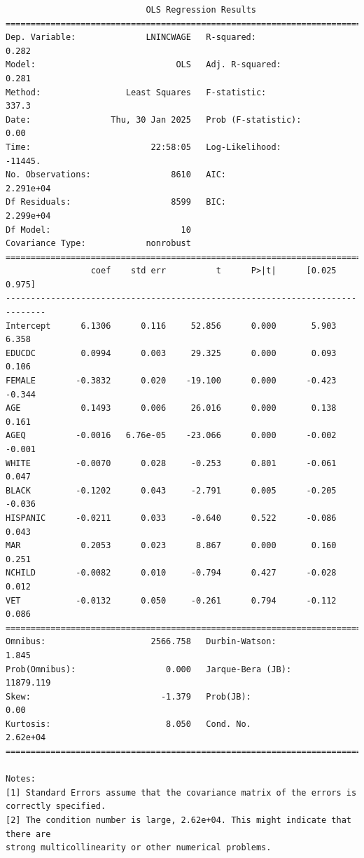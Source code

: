 \documentclass[
  11pt,
  letterpaper,
  DIV=11,
  numbers=noendperiod]{scrartcl}
\begin{document}
\begin{verbatim}
                            OLS Regression Results                            
==============================================================================
Dep. Variable:              LNINCWAGE   R-squared:                       0.282
Model:                            OLS   Adj. R-squared:                  0.281
Method:                 Least Squares   F-statistic:                     337.3
Date:                Thu, 30 Jan 2025   Prob (F-statistic):               0.00
Time:                        22:58:05   Log-Likelihood:                -11445.
No. Observations:                8610   AIC:                         2.291e+04
Df Residuals:                    8599   BIC:                         2.299e+04
Df Model:                          10                                         
Covariance Type:            nonrobust                                         
==============================================================================
                 coef    std err          t      P>|t|      [0.025      0.975]
------------------------------------------------------------------------------
Intercept      6.1306      0.116     52.856      0.000       5.903       6.358
EDUCDC         0.0994      0.003     29.325      0.000       0.093       0.106
FEMALE        -0.3832      0.020    -19.100      0.000      -0.423      -0.344
AGE            0.1493      0.006     26.016      0.000       0.138       0.161
AGEQ          -0.0016   6.76e-05    -23.066      0.000      -0.002      -0.001
WHITE         -0.0070      0.028     -0.253      0.801      -0.061       0.047
BLACK         -0.1202      0.043     -2.791      0.005      -0.205      -0.036
HISPANIC      -0.0211      0.033     -0.640      0.522      -0.086       0.043
MAR            0.2053      0.023      8.867      0.000       0.160       0.251
NCHILD        -0.0082      0.010     -0.794      0.427      -0.028       0.012
VET           -0.0132      0.050     -0.261      0.794      -0.112       0.086
==============================================================================
Omnibus:                     2566.758   Durbin-Watson:                   1.845
Prob(Omnibus):                  0.000   Jarque-Bera (JB):            11879.119
Skew:                          -1.379   Prob(JB):                         0.00
Kurtosis:                       8.050   Cond. No.                     2.62e+04
==============================================================================

Notes:
[1] Standard Errors assume that the covariance matrix of the errors is correctly specified.
[2] The condition number is large, 2.62e+04. This might indicate that there are
strong multicollinearity or other numerical problems.
\end{verbatim}
\end{document}
